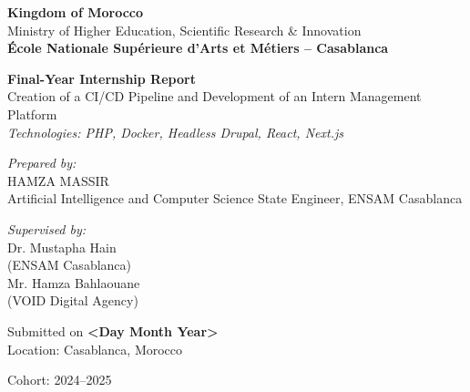 \begin{titlepage}
  \centering

  {\small \textbf{Kingdom of Morocco}\\
  Ministry of Higher Education, Scientific Research \& Innovation}\\[1em]
  {\small \bfseries École Nationale Supérieure d'Arts et Métiers -- Casablanca}\\[2em]


  \vfill

  {\LARGE \bfseries Final-Year Internship Report}\\[1em]
  {\Large Creation of a CI/CD Pipeline and Development of an Intern Management Platform}\\[2em]

  {\large \textit{Technologies: PHP, Docker, Headless Drupal, React, Next.js}}\\[3em]

  \begin{minipage}{0.45\textwidth}
    \raggedright
    {\large \emph{Prepared by:}\\
    \textsc{HAMZA MASSIR}\\
    \vspace{0.5em}
    Artificial Intelligence and Computer Science State Engineer, ENSAM Casablanca}
  \end{minipage}
  \hfill
  \begin{minipage}{0.45\textwidth}
    \raggedleft
    {\large \emph{Supervised by:}\\
    Dr. Mustapha Hain \\ (ENSAM Casablanca)\\[0.5em]
    Mr. Hamza Bahlaouane \\ (VOID Digital Agency)}
  \end{minipage}

  \vfill

  {\large Submitted on \textbf{<Day Month Year>}}\\[1em]
  {\large Location: Casablanca, Morocco}

  \vfill

  {\large Cohort: 2024--2025}
\end{titlepage}
